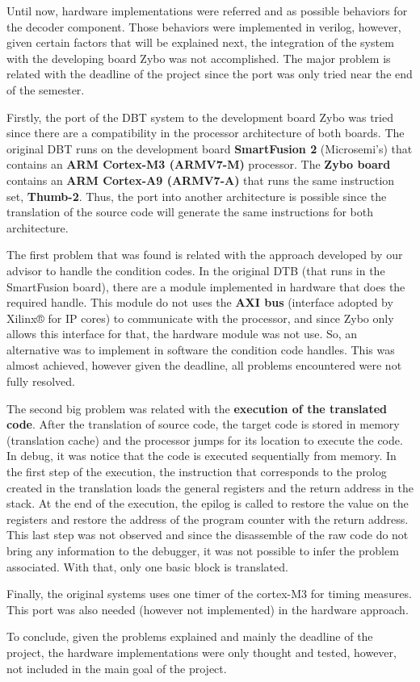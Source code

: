 Until now, hardware implementations were referred and as possible behaviors for the decoder component. Those behaviors were implemented in verilog, however, given certain factors that will be explained next, the integration of the system with the developing board Zybo was not accomplished. The major problem is related with the deadline of the project since the port was only tried near the end of the semester.

Firstly, the port of the DBT system to the development board Zybo was tried since there are a compatibility in the processor architecture of both boards. The original DBT runs on the development board \textbf{SmartFusion 2} (Microsemi's) that contains an \textbf{ARM Cortex-M3 (ARMV7-M)} processor. The \textbf{Zybo board} contains an \textbf{ARM Cortex-A9 (ARMV7-A)} that runs the same instruction set, \textbf{Thumb-2}. Thus, the port into another architecture is possible since the translation of the source code will generate the same instructions for both architecture. 

The first problem that was found is related with the approach developed by our advisor to handle the condition codes. In the original DTB (that runs in the SmartFusion board), there are a module implemented in hardware that does the required handle. This module do not uses the \textbf{AXI bus} (interface adopted by Xilinx® for IP cores) to communicate with the processor, and since Zybo only allows this interface for that, the hardware module was not use. So, an alternative was to implement in software the condition code handles. This was almost achieved, however given the deadline, all problems encountered were not fully resolved.

The second big problem was related with the \textbf{execution of the translated code}. After the translation of source code, the target code is stored in memory (translation cache) and the processor jumps for its location to execute the code. In debug, it was notice that the code is executed sequentially from memory. In the first step of the execution, the instruction that corresponds to the prolog created in the translation loads the general registers and the return address in the stack. At the end of the execution, the epilog is called to restore the value on the registers and restore the address of the program counter with the return address. This last step was not observed and since the disassemble of the raw code do not bring any information to the debugger, it was not possible to infer the problem associated. With that, only one basic block is translated. 

Finally, the original systems uses one timer of the cortex-M3 for timing measures. This port was also needed (however not implemented) in the hardware approach.

To conclude, given the problems explained and mainly the deadline of the project, the hardware implementations were only thought and tested, however, not included in the main goal of the project.

